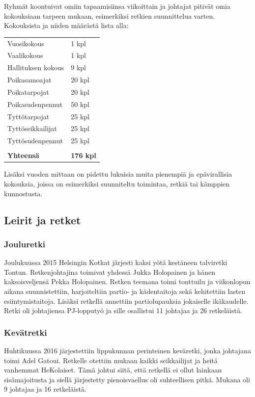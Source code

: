 \documentclass[a4paper, 12pt, finnish]{report} %
\begin{document}
Ryhmät koontuivat omiin tapaamisiinsa viikoittain ja johtajat pitivät omia kokouksiaan tarpeen mukaan, esimerkiksi retkien suunnittelua varten. Kokouksista ja niiden määrästä lista alla:\\
\begin{center}
	\begin{tabular}{ l l }
		Vuosikokous & 1 kpl\\
		Vaalikokous & 1 kpl\\
		Hallituksen kokous & 9 kpl\\
		Poikasamoajat & 20 kpl\\
		Poikatarpojat & 20 kpl\\
		Poikasudenpennut & 50 kpl\\
		Tyttötarpojat & 25 kpl\\
		Tyttöseikkailijat & 25 kpl\\
		Tyttösudenpennut & 25 kpl\\
					 & \\
		\textbf{Yhteensä} & \textbf{176 kpl}\\
	\end{tabular}
\end{center}
Lisäksi vuoden mittaan on pidettu lukuisia muita pienempiä ja epävirallisia kokouksia, joissa on esimerkiksi suunniteltu toimintaa, retkiä tai kämppien kunnostusta.
\subsection{Leirit ja retket}
\subsubsection{Jouluretki}
Joulukuussa 2015 Helsingin Kotkat järjesti kaksi yötä kestäneen talviretki Tontun. Retkenjohtajina toimivat yhdessä Jukka Holopainen ja hänen kaksoisveljensä Pekka Holopainen. Retken teemana toimi tonttuilu ja viikonlopun aikana suunnistettiin, harjoiteltiin partio- ja kädentaitoja sekä kehitettiin lasten esiintymistaitoja. Lisäksi retkellä annettiin partiolupauksia jokaiselle ikäkaudelle. Retki oli johtajiensa PJ-lopputyö ja sille osallistui 11 johtajaa ja 26 retkeläistä.
\subsubsection{Kevätretki}
Huhtikuussa 2016 järjestettiin lippukunnan perinteinen keväretki, jonka johtajana toimi Adel Gatoui. Retkelle otettiin mukaan kaikki seikkailijat ja heitä vanhemmat HeKolaiset. Tämä johtui siitä, että retkellä ei ollut lainkaan sisämajoitusta ja siellä järjestetty pienoisvaellus oli suhteellisen pitkä. Mukana oli 9 johtajaa ja 16 retkeläistä.
\end{document}
